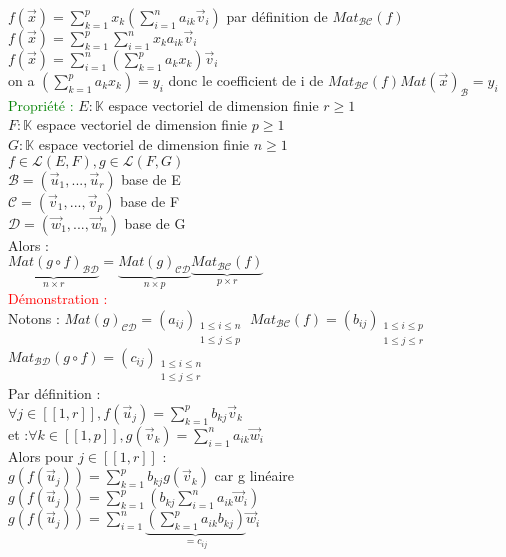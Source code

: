 \documentclass{article}
\begin{document}
        $f(\vec x)= \sum_{k=1}^p x_k (\sum_{i=1}^n a_{ik} \vec v_i)$ par définition de $Mat_{\mathcal{BC}}(f)$  \\
        $f(\vec x)= \sum_{k=1}^p \sum_{i=1}^n x_k a_{ik} \vec v_i$ \\
        $f(\vec x)= \sum_{i=1}^n (\sum_{k=1}^p a_k x_k) \vec v_i$ \\
        on a $(\sum_{k=1}^p a_k x_k)=y_i$ donc le coefficient de i de $Mat_{\mathcal{BC}} (f) Mat(\vec x)_{\mathcal B}=y_i$ \\
        \textcolor{green}{Propriété :} $E: \mathbb K$ espace vectoriel de dimension finie $r \geq 1$ \\
        $F: \mathbb K$ espace vectoriel de dimension finie $p \geq 1$ \\
        $G: \mathbb K$ espace vectoriel de dimension finie $n \geq 1$ \\
        $f \in \mathcal L(E,F), g \in \mathcal L(F,G)$ \\
        $\mathcal B =( \vec u_1,..., \vec u_r) $ base de E \\
        $\mathcal C =( \vec v_1,..., \vec v_p) $ base de F \\
        $\mathcal D =( \vec w_1,..., \vec w_n) $ base de G \\
        Alors : \\
        $\underbrace{Mat(g \circ f)_{\mathcal{BD}}}_{n \times r}=\underbrace{Mat(g)_{\mathcal{CD}}}_{n \times p} \underbrace{Mat_{\mathcal{BC}}(f)}_{p \times r}$ \\
        \textcolor{red}{Démonstration :} \\
        Notons : $Mat(g)_{\mathcal{CD}}=(a_{ij}){}_{\substack{1\leq i\leq n \\ 1\leq j\leq p}}$
        $Mat_{\mathcal{BC}}(f)=(b_{ij}){}_{\substack{1\leq i\leq p \\ 1\leq j\leq r}}$ \\
        $Mat_{\mathcal{BD}}(g \circ f)=(c_{ij}){}_{\substack{1\leq i\leq n \\ 1\leq j\leq r}}$  \\
        Par définition : \\
        $\forall j \in [[1,r]], f(\vec u_j)=\sum_{k=1}^p b_{kj} \vec v_k$\\
        et :$\forall k \in [[1,p]], g(\vec v_k)=\sum_{i=1}^n a_{ik} \vec w_i$ \\
        Alors pour $j \in [[ 1,r ]] $ : \\
        $g(f(\vec u_j))= \sum_{k=1}^p b_{kj} g(\vec v_k)$ car g linéaire \\
        $g(f(\vec u_j))=\sum_{k=1}^p(b_{kj}\sum_{i=1}^n a_{ik} \vec w_i)$ \\
        $g(f(\vec u_j))=\sum_{i=1}^n\underbrace{(\sum_{k=1}^p a_{ik} b_{kj})}_{=c_{ij}} \vec w_i$ \\
\end{document}
